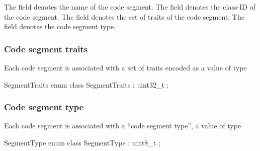  The  field denotes the name of the code segment.
 The  field denotes the class-ID of the code segment.
 The  field denotes the set of traits of the code segment.
 The  field denotes the code segment type.

\subsubsection{Code segment traits}
\label{sec:ifc-code-segment-traits}

Each code segment is associated with a set of traits encoded as a value
of type
%
\begin{typedef}{SegmentTraits}{}
	enum class SegmentTraits : uint32_t { };
\end{typedef}
%

\subsubsection{Code segment type}
\label{sec:ifc-code-segment-type}

Each code segment is associated with a ``code segment type'', a value of type
%
\begin{typedef}{SegmentType}{}
	enum class SegmentType : uint8_t { };
\end{typedef}


